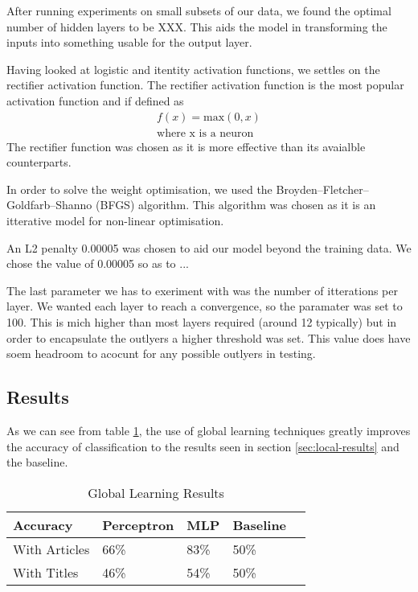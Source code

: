 \documentclass[bsc,frontabs,twoside,singlespacing,parskip,deptreport]{infthesis}     %
\begin{document}
After running experiments on  small subsets of our data, we found the optimal number of hidden layers to be XXX. 
This aids the model in transforming the inputs into something usable for the output layer.

Having looked at logistic and itentity activation functions, we settles on the rectifier activation function.
The rectifier activation function is the most popular activation function \cite{lecun2015deep} and if defined as
\begin{eqnarray}
  f(x) = \text{max}(0,x)\nonumber\\
  \text{where x is a neuron}\nonumber
\end{eqnarray}
The rectifier function was chosen as it is more effective than its avaialble counterparts\cite{glorot2011deep}.

In order to solve the weight optimisation, we used the Broyden–Fletcher–Goldfarb–Shanno (BFGS) algorithm.
This algorithm was chosen as it is an itterative model for non-linear optimisation.

An L2 penalty 0.00005 was chosen to aid our model beyond the training data.
We chose the value of 0.00005 so as to ...

The last parameter we has to exeriment with was the number of itterations per layer.
We wanted each layer to reach a convergence, so the paramater was set to 100.
This is mich higher than most layers required (around 12 typically) but in order to encapsulate the outlyers
a higher threshold was set. This value does have soem headroom to acocunt for any possible outlyers in testing.

\subsection{Results}
As we can see from table \ref{table:global-learning},  the use of global learning techniques greatly improves the accuracy
of classification to the results seen in section \ref{sec:local-results} and the baseline.

\begin{table}[H]
\centering
\label{table:global-learning}
\begin{tabular}{|p{5em}|l|l|p{4em}|l|}
  \hline
  {\small Accuracy}  & {\small Perceptron} & {\small MLP} & Baseline\\
  \hline
{\small With Articles}    & 66\%  & 83\% & 50\%\\
\hline
{\small With Titles} & 46\%  & 54\% & 50\%\\
\hline
\end{tabular}
\caption{Global Learning Results}
\end{table}
\end{document}
